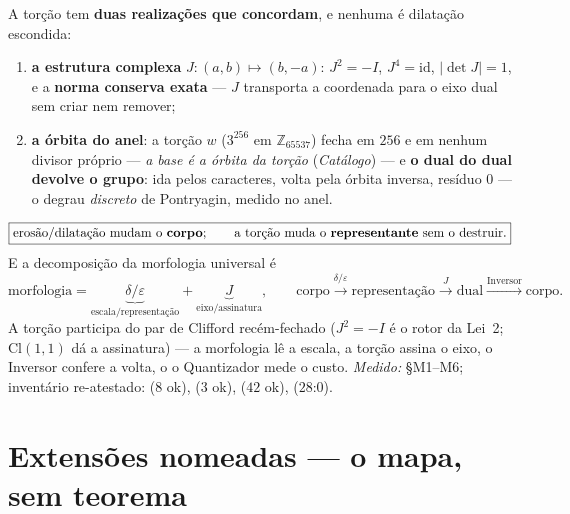 \documentclass[livro.tex]{subfiles}
\begin{document}
\begin{teorema}[a torção]\label{thm:torcao}
A torção tem \textbf{duas realizações que concordam}, e nenhuma é
dilatação escondida:
\begin{enumerate}
\item \textbf{a estrutura complexa} $J\colon(a,b)\mapsto(b,-a)$:
$J^{2}=-I$, $J^{4}=\mathrm{id}$, $|\det J|=1$, e a \textbf{norma
conserva exata} --- $J$ transporta a coordenada para o eixo dual sem
criar nem remover;
\item \textbf{a órbita do anel}: a torção $w$ ($3^{256}$ em
$\mathbb{Z}_{65537}$) fecha em $256$ e em nenhum divisor próprio ---
\emph{a base é a órbita da torção} (\emph{Catálogo}) --- e \textbf{o
dual do dual devolve o grupo}: ida pelos caracteres, volta pela órbita
inversa, resíduo $0$ --- o degrau \emph{discreto} de Pontryagin,
medido no anel.
\end{enumerate}
\[
\boxed{
\text{erosão/dilatação mudam o \textbf{corpo}};
\qquad
\text{a torção muda o \textbf{representante} sem o destruir.}
}
\]
E a decomposição da morfologia universal é
\[
\boxed{
\text{morfologia}=\underbrace{\delta/\varepsilon}_{\text{escala/representação}}
+\underbrace{J}_{\text{eixo/assinatura}},
}
\qquad
\text{corpo}\xrightarrow{\delta/\varepsilon}\text{representação}
\xrightarrow{J}\text{dual}\xrightarrow{\text{Inversor}}\text{corpo}.
\]
A torção participa do par de Clifford recém-fechado ($J^{2}=-I$ é o
rotor da Lei~2; $\mathrm{Cl}(1,1)$ dá a assinatura) --- a morfologia lê
a escala, a torção assina o eixo, o Inversor confere a volta, o
o Quantizador mede o custo.
\emph{Medido:}  \S M1--M6;
inventário re-atestado:  ($8$ ok),
 ($3$ ok),  ($42$ ok),
 ($28$:$0$).
\end{teorema}

\section{Extensões nomeadas --- o mapa, sem teorema}\label{sec:extensoes}
\end{document}
